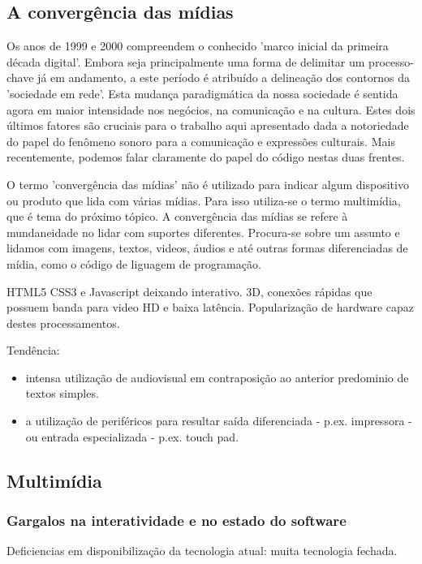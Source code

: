       \subsection{A convergência das mídias}
      \label{sec:midiamultimidia}

      Os anos de 1999 e 2000 compreendem o conhecido 'marco inicial da primeira década digital'.
      Embora seja principalmente uma forma de delimitar um processo-chave já em andamento, a este período é atribuído
      a delineação dos contornos da 'sociedade em rede'. Esta mudança paradigmática da nossa
      sociedade é sentida agora em maior intensidade nos negócios, na comunicação e na cultura. Estes dois
      últimos fatores são cruciais para o trabalho aqui apresentado dada a notoriedade do papel do
      fenômeno sonoro para a comunicação e expressões culturais. Mais recentemente, podemos falar claramente
      do papel do código nestas duas frentes.

      O termo 'convergência das mídias' não é utilizado para indicar algum dispositivo ou produto que
      lida com várias mídias. Para isso utiliza-se o termo multimídia, que é tema do próximo tópico.
      A convergência das mídias se refere à mundaneidade no lidar com suportes diferentes. Procura-se
      sobre um assunto e lidamos com imagens, textos, videos, áudios e até outras formas diferenciadas
      de mídia, como o código de liguagem de programação.


      HTML5 CSS3 e Javascript deixando interativo. 3D, conexões rápidas que possuem banda para video HD e
      baixa latência. Popularização de hardware capaz destes processamentos.

      Tendência:
      \begin{itemize}
	  \item intensa utilização de audiovisual em contraposição ao
      anterior predominio de textos simples.
	  \item a utilização de periféricos para resultar saída diferenciada - p.ex.
      impressora - ou entrada especializada - p.ex. touch pad.
      \end{itemize}


      \subsection{Multimídia}


	  \subsubsection{Gargalos na interatividade e no estado do software}
	  \label{sec:gargalos}
	  Deficiencias em disponibilização da tecnologia atual: muita
	  tecnologia fechada.

